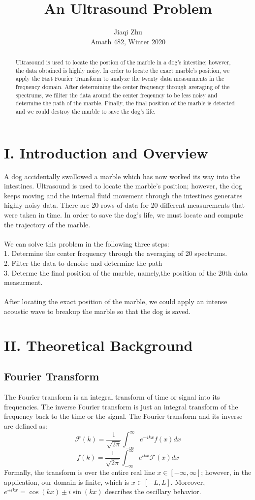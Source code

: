 \documentclass[12pt,letterpaper]{article}
\author{Jiaqi Zhu \\Amath 482, Winter 2020}
\title{An Ultrasound Problem}
\begin{document}
\maketitle
\begin{abstract}
Ultrasound is used to locate the postion of the marble in a dog's intestine; however, the data obtained is highly noisy. In order to locate the exact marble's position, we apply the Fast Fourier Transform to analyze the twenty data measurments in the frequency domain. After determining the center frequency through averaging of the spectrums, we filiter the data around the center freqeuncy to be less noisy and determine the path of the marble. Finally, the final position of the marble is detected and we could destroy the marble to save the dog's life. 
\end{abstract}

\section*{I. Introduction and Overview}
A dog accidentally swallowed a marble which has now worked its way into the intestines. Ultrasound is used to locate the marble's position; however, the dog keeps moving and the internal fluid movement through the intestines generates highly noisy data. There are 20 rows
of data for 20 different measurements that were taken in time. In order to save the dog's life, we must locate and compute the trajectory of the marble. 
\\
\\We can solve this problem in the following three steps:
\\1. Determine the center frequency through the averaging of 20 spectrums. 
\\2. Filter the data to denoise and determine the path
\\3. Determe the final position of the marble, namely,the position of the 20th data measurment.
\\
\\After locating the exact position of the marble, we could apply an intense acoustic wave to breakup the marble so that the dog is saved.  
\section*{II. Theoretical Background}
\subsection*{Fourier Transform}
The Fourier transform is an integral transform of time or signal into its frequencies. The inverse Fourier transform is just an integral transform of the frequency back to the time or the signal. The Fourier transform and its inverse are defined as:
$$\mathcal{F}(k) = \dfrac{1}{\sqrt{2\pi}}\int_{-\infty}^{\infty}e^{-ikx}f(x)dx$$
$$f(k) = \dfrac{1}{\sqrt{2\pi}}\int_{-\infty}^{\infty}e^{ikx}\mathcal{F}(x)dx$$
Formally, the transform is over the entire real line $x\in [-\infty, \infty]$; however, in the application, our domain is finite, which is $x \in [-L,L]$. Moreover, $e^{\pm{ikx}} = \cos(kx)\pm{i\sin(kx)}$ describes the oscillary behavior. 
\end{document}

